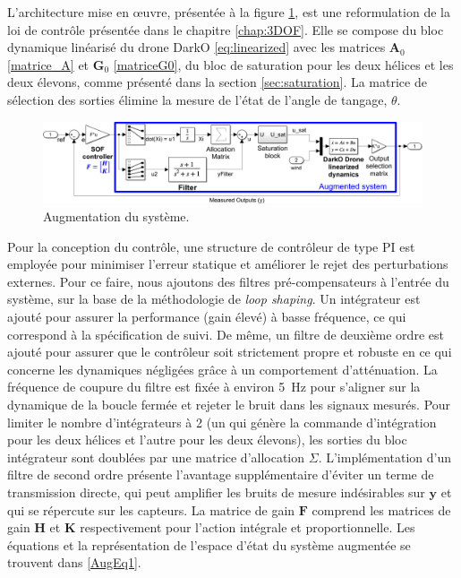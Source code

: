  L'architecture mise en œuvre, présentée à la figure \ref{Plant Augmentation}, est une reformulation de la loi de contrôle présentée dans le chapitre \ref{chap:3DOF}. Elle se compose du bloc dynamique linéarisé du drone DarkO \eqref{eq:linearized} avec les matrices $\boldsymbol{A}_{0}$ \eqref{matrice_A} et $\boldsymbol{G}_{0}$ \eqref{matriceG0}, du bloc de saturation pour les deux hélices et les deux élevons, comme présenté dans la section \ref{sec:saturation}. La matrice de sélection des sorties élimine la mesure de l'état de l'angle de tangage, $\theta$.

\begin{figure}[hbt]
    \centering
    \includegraphics[width=0.9\columnwidth]{figures/AugWindFinal.png}
    \vspace{-0.3cm}\caption{Augmentation du système.}
    \label{Plant Augmentation}
\end{figure}


Pour la conception du contrôle, une structure de contrôleur de type PI est employée pour minimiser l'erreur statique et améliorer le rejet des perturbations externes. Pour ce faire, nous ajoutons des filtres pré-compensateurs à l'entrée du système, sur la base de la méthodologie de \textit{loop shaping}. Un intégrateur est ajouté pour assurer la performance (gain élevé) à basse fréquence, ce qui correspond à la spécification de suivi. De même, un filtre de deuxième ordre est ajouté pour assurer que le contrôleur soit strictement propre et robuste en ce qui concerne les dynamiques négligées grâce à un comportement d'atténuation. La fréquence de coupure du filtre est fixée à environ \SI{5}{\hertz} pour s'aligner sur la dynamique de la boucle fermée et rejeter le bruit dans les signaux mesurés. Pour limiter le nombre d'intégrateurs à 2 (un qui génère la commande d'intégration pour les deux hélices et l'autre pour les deux élevons), les sorties du bloc intégrateur sont doublées par une matrice d'allocation $\Sigma$. L'implémentation d'un filtre de second ordre présente l'avantage supplémentaire d'éviter un terme de transmission directe, qui peut amplifier les bruits de mesure indésirables sur $\boldsymbol{y}$ et qui se répercute sur les capteurs. La matrice de gain $\boldsymbol{F}$ comprend les matrices de gain $\boldsymbol{H}$ et $\boldsymbol{K}$ respectivement pour l'action intégrale et proportionnelle. Les équations et la représentation de l'espace d'état du système augmentée se trouvent dans \eqref{AugEq1}.

